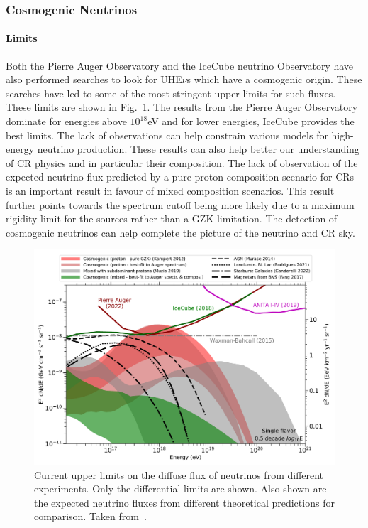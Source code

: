 \subsubsection*{Cosmogenic Neutrinos}

  \paragraph{Limits}
  \label{subsubsec:CosmoNuLimits}
  Both the Pierre Auger Observatory and the IceCube neutrino Observatory have also performed searches to look for UHE$\nu$s which have a cosmogenic origin. These searches have led to some of the most stringent upper limits for such fluxes. These limits are shown in Fig.~\ref{fig:Nu_limits_auger}. The results from the Pierre Auger Observatory dominate for energies above $10^{18}$eV and for lower energies, IceCube provides the best limits. The lack of observations can help constrain various models for high-energy neutrino production. These results can also help better our understanding of \gls{CR} physics and in particular their composition. The lack of observation of the expected neutrino flux predicted by a pure proton composition scenario for \glspl{CR} is an important result in favour of mixed composition scenarios. This result further points towards the spectrum cutoff being more likely due to a maximum rigidity limit for the sources rather than a GZK limitation. The detection of cosmogenic neutrinos can help complete the picture of the neutrino and \gls{CR} sky. 

\begin{figure}[t!]
  \centering
  \includegraphics[width=14.5cm]{thesis_figures/CRnNu/neutrinolimits_icrc2023_wiki.pdf}
  \caption{Current upper limits on the diffuse flux of neutrinos from different experiments. Only the differential limits are shown. Also shown are the expected neutrino fluxes from different theoretical predictions for comparison. Taken from~\cite{PierreAuger:2023pjg}.}
  \label{fig:Nu_limits_auger}
\end{figure}

